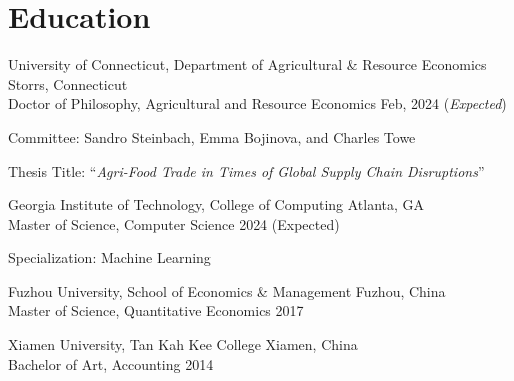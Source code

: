 \documentclass[10.5 pt,letterpaper]{article}
\renewenvironment{itemize}{
	\begin{list}{}{
			\setlength{\leftmargin}{1.5em}
		}
	}{
	\end{list}
}
\begin{document}
	\section*{\textbf{ Education}}
	\begin{itemize}
		\item[-]  University of Connecticut, Department of Agricultural \& Resource Economics  \hfill Storrs, Connecticut \\
	 Doctor of Philosophy, Agricultural and Resource Economics  \hfill  Feb, 2024 (\textit{Expected})
	
			
			Committee:	 	 Sandro Steinbach,	Emma Bojinova, and Charles Towe 
			
			Thesis Title: ``\textit{Agri-Food Trade in Times of Global Supply Chain Disruptions}''
			
 
		 
	
		 \item[-]    Georgia Institute of Technology, College of  Computing \hfill   Atlanta, GA   \\ 
		 Master of Science, Computer Science  \hfill      2024 (Expected)
 
	Specialization: Machine Learning
 
		\item[-]  Fuzhou University, School of Economics \& Management \hfill Fuzhou, China \\ 
		Master of Science,   Quantitative Economics  \hfill    2017
		
				
		\item[-]  Xiamen University, Tan Kah Kee College    \hfill  Xiamen, China \\
		Bachelor of Art,  Accounting \hfill    2014
		

\end{itemize}
\end{document}
